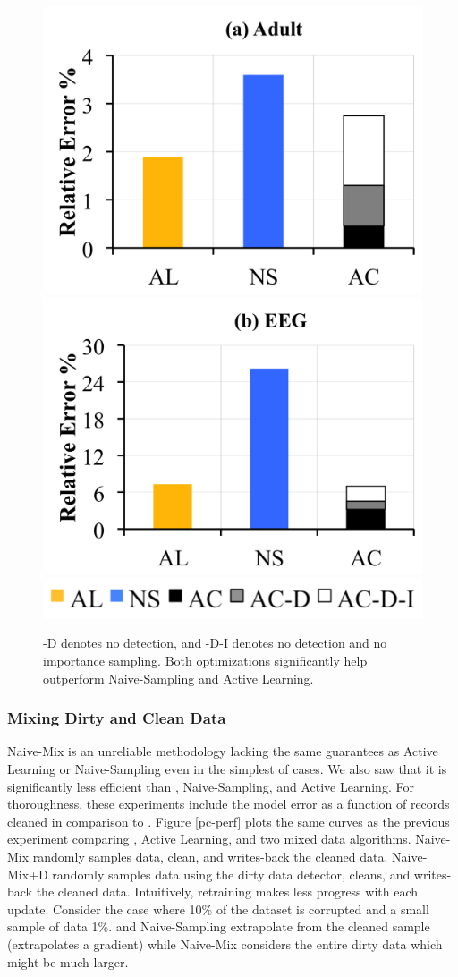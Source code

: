 \begin{figure}[t]\vspace{0.5em}
\centering
 \includegraphics[width=0.49\columnwidth]{exp/exp8a.png}
 \includegraphics[width=0.49\columnwidth]{exp/exp8b.png}
 \includegraphics[width=0.5\columnwidth]{exp/legend-8.png}\vspace{-1em}
 \caption{ -D denotes no detection, and -D-I denotes no detection and no importance sampling. Both optimizations significantly help \sys outperform Naive-Sampling and Active Learning. \label{opts}}\vspace{-1.5em}
\end{figure}

\subsubsection{Mixing Dirty and Clean Data}\label{exp:rtr}
Naive-Mix is an unreliable methodology lacking the same guarantees as Active Learning or Naive-Sampling even in the simplest of cases.
We also saw that it is significantly less efficient than \sys, Naive-Sampling, and Active Learning.
For thoroughness, these experiments include the model error as a function of records cleaned in comparison to \sys.
Figure \ref{pc-perf} plots the same curves as the previous experiment comparing \sys, Active Learning, and two mixed data algorithms.
Naive-Mix randomly samples data, clean, and writes-back the cleaned data.
Naive-Mix+D randomly samples data using the dirty data detector, cleans, and writes-back the cleaned data.
Intuitively, retraining makes less progress with each update.
Consider the case where 10\% of the dataset is corrupted and a small sample of data 1\%.
\sys and Naive-Sampling extrapolate from the cleaned sample (\sys extrapolates a gradient) while Naive-Mix considers the entire dirty data which might be much larger.

